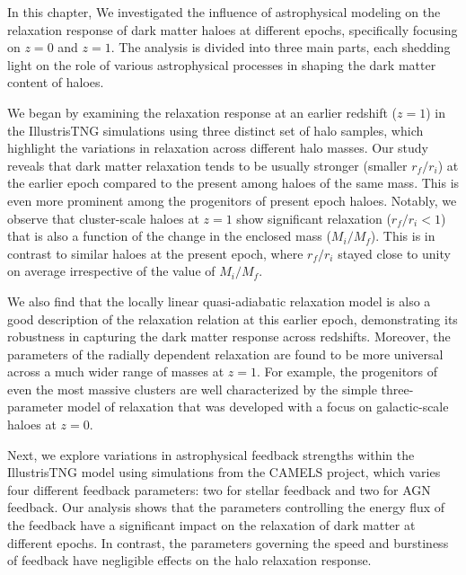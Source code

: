 In this chapter, We investigated the influence of astrophysical modeling on the relaxation response of dark matter haloes at different epochs, specifically focusing on \( z=0 \) and \( z=1 \). The analysis is divided into three main parts, each shedding light on the role of various astrophysical processes in shaping the dark matter content of haloes.

We began by examining the relaxation response at an earlier redshift (\( z=1 \)) in the IllustrisTNG simulations using three distinct set of halo samples, which highlight the variations in relaxation across different halo masses. Our study reveals that dark matter relaxation tends to be usually stronger (smaller \(r_f/r_i\)) at the earlier epoch compared to the present among haloes of the same mass. This is even more prominent among the progenitors of present epoch haloes. Notably, we observe that cluster-scale haloes at \( z=1 \) show significant relaxation (\(r_f/r_i<1\)) that is also a function of the change in the enclosed mass (\(M_i/M_f\)). This is in contrast to similar haloes at the present epoch, where \(r_f/r_i\) stayed close to unity on average irrespective of the value of \(M_i/M_f\).

We also find that the locally linear quasi-adiabatic relaxation model is also a good description of the relaxation relation at this earlier epoch, demonstrating its robustness in capturing the dark matter response across redshifts. Moreover, the parameters of the radially dependent relaxation are found to be more universal across a much wider range of masses at \( z=1 \). For example, the progenitors of even the most massive clusters are well characterized by the simple three-parameter model of relaxation that was developed with a focus on galactic-scale haloes at \( z=0 \).

Next, we explore variations in astrophysical feedback strengths within the IllustrisTNG model using simulations from the CAMELS project, which varies four different feedback parameters: two for stellar feedback and two for AGN feedback. Our analysis shows that the parameters controlling the energy flux of the feedback have a significant impact on the relaxation of dark matter at different epochs. In contrast, the parameters governing the speed and burstiness of feedback have negligible effects on the halo relaxation response.

